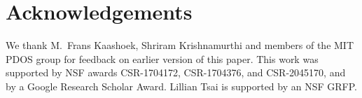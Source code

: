 \section*{Acknowledgements}

We thank M.\ Frans Kaashoek, Shriram Krishnamurthi and members of the MIT PDOS group for feedback on
earlier version of this paper.
%
This work was supported by NSF awards CSR-1704172, CSR-1704376, and CSR-2045170, and by a Google
Research Scholar Award. Lillian Tsai is supported by an NSF GRFP.
%

